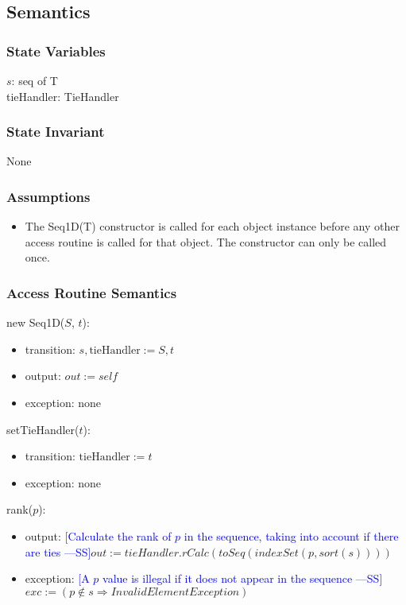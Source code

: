 \documentclass[12pt,fleqn]{examtst}
\newcommand{\authornote}[3]{\textcolor{#1}{[#3 ---#2]}}
\newcommand{\authornote}[3]{}
\newcommand{\wss}[1]{\authornote{blue}{SS}{#1}}
\begin{document}
\subsection* {Semantics}

\subsubsection* {State Variables}

$s$: seq of T\\
tieHandler: TieHandler

\subsubsection* {State Invariant}

None

\subsubsection* {Assumptions}

\begin{itemize}
\item The Seq1D(T) constructor is called for each object instance before any
other access routine is called for that object.  The constructor can only be
called once.
\end{itemize}

\subsubsection* {Access Routine Semantics}

new Seq1D($S$, $t$):
\begin{itemize}
\item transition: $s, \text{tieHandler} := S, t$
\item output: $\mathit{out} := \mathit{self}$
\item exception: none
\end{itemize}

\noindent setTieHandler($t$):
\begin{itemize}
\item transition: $\mbox{tieHandler} := t$
\item exception: none
\end{itemize}

\noindent rank($p$):
\begin{itemize}
\item output: \wss{Calculate the rank of $p$ in the sequence, taking into
    account if there are ties}$out := tieHandler.rCalc(toSeq(indexSet(p, sort(s))))$
\item exception: \wss{A $p$ value is illegal if it does not appear in the
    sequence}$exc := (p \notin s \Rightarrow InvalidElementException)$
\end{itemize}
\end{document}
